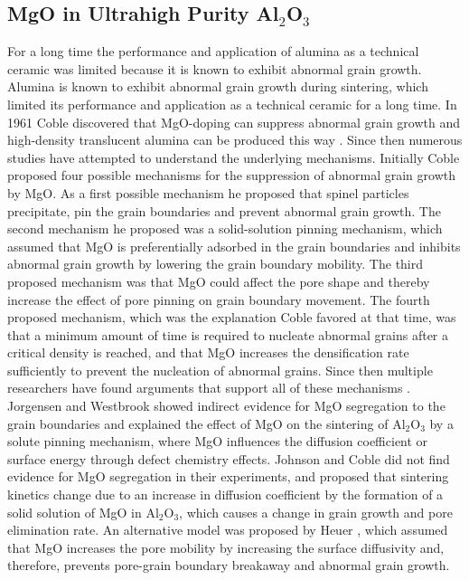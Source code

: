 \subsection{MgO in Ultrahigh Purity Al$_{2}$O$_{3}$}

For a long time the performance and application of alumina as a technical ceramic was limited because it is known to exhibit abnormal grain growth. Alumina is known to exhibit abnormal grain growth during sintering, which limited its performance and application as a technical ceramic for a long time. In 1961 Coble discovered that MgO-doping can suppress abnormal grain growth and high-density translucent alumina can be produced this way \cite{Coble1962a,Coble1962,Coble1961}. Since then numerous studies have attempted to understand the underlying mechanisms. Initially Coble proposed four possible mechanisms for the suppression of abnormal grain growth by MgO. As a first possible mechanism he proposed that spinel particles precipitate, pin the grain boundaries and prevent abnormal grain growth. The second mechanism he proposed was a solid-solution pinning mechanism, which assumed that MgO is preferentially adsorbed in the grain boundaries and inhibits abnormal grain growth by lowering the grain boundary mobility. The third proposed mechanism was that MgO could affect the pore shape and thereby increase the effect of pore pinning on grain boundary movement. The fourth proposed mechanism, which was the explanation Coble favored at that time, was that a minimum amount of time is required to nucleate abnormal grains after a critical density is reached, and that MgO increases the densification rate sufficiently to prevent the nucleation of abnormal grains. Since then multiple researchers have found arguments that support all of these mechanisms \cite{Bennison1990}. Jorgensen and Westbrook \cite{Jorgensen1964,Jorgensen1965} showed indirect evidence for MgO segregation to the grain boundaries and explained the effect of MgO on the sintering of Al$_{2}$O$_{3}$ by a solute pinning mechanism, where MgO influences the diffusion coefficient or surface energy through defect chemistry effects. Johnson and Coble \cite{Johnson1978} did not find evidence for MgO segregation in their experiments, and proposed that sintering kinetics change due to an increase in diffusion coefficient by the formation of a solid solution of MgO in Al$_{2}$O$_{3}$, which causes a change in grain growth and pore elimination rate. An alternative model was proposed by Heuer \cite{Heuer1979}, which assumed that MgO increases the pore mobility by increasing the surface diffusivity and, therefore, prevents pore-grain boundary breakaway and abnormal grain growth. 

